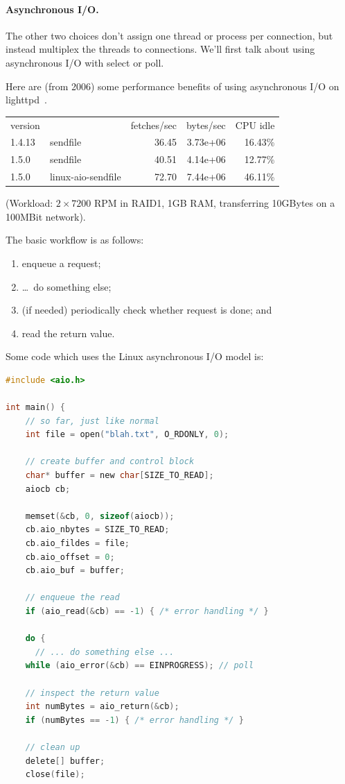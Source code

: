 \paragraph{Asynchronous I/O.} The other two choices don't assign one thread or process per connection,
but instead multiplex the threads to connections. We'll first talk
about using asynchronous I/O with select or poll.  

Here are (from 2006) some performance benefits of using asynchronous
I/O on lighttpd~\cite{lttpd}.

    \begin{tabular}{llrrr}
    version & & fetches/sec & bytes/sec & CPU idle \\
    1.4.13 & sendfile & 36.45 & 3.73e+06 & 16.43\% \\
    1.5.0 & sendfile & 40.51 & 4.14e+06 & 12.77\% \\
    1.5.0 & linux-aio-sendfile & 72.70 & 7.44e+06 & 46.11\% \\
    \end{tabular}

(Workload: $2\times 7200$ RPM in RAID1, 1GB RAM, transferring 10GBytes on a 100MBit network).

The basic workflow is as follows: 
   \begin{enumerate}
     \item enqueue a request;
     \item \ldots ~do something else;
     \item (if needed) periodically check whether request is done; and
     \item read the return value.
   \end{enumerate}

Some code which uses the Linux asynchronous I/O model is:
\begin{lstlisting}[language=C]
#include <aio.h>

int main() {
    // so far, just like normal
    int file = open("blah.txt", O_RDONLY, 0);

    // create buffer and control block
    char* buffer = new char[SIZE_TO_READ];
    aiocb cb;
    
    memset(&cb, 0, sizeof(aiocb));
    cb.aio_nbytes = SIZE_TO_READ;
    cb.aio_fildes = file;
    cb.aio_offset = 0;
    cb.aio_buf = buffer;

    // enqueue the read
    if (aio_read(&cb) == -1) { /* error handling */ }

    do {
      // ... do something else ...
    while (aio_error(&cb) == EINPROGRESS); // poll

    // inspect the return value
    int numBytes = aio_return(&cb);
    if (numBytes == -1) { /* error handling */ }

    // clean up
    delete[] buffer;
    close(file);
\end{lstlisting}

